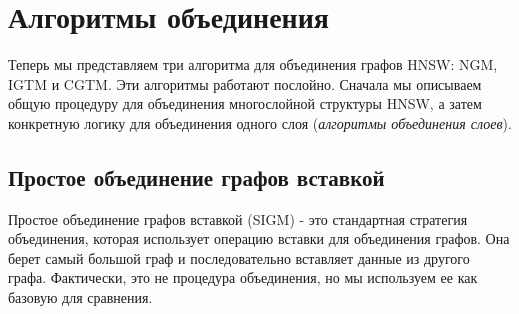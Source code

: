 \documentclass{article}
\begin{document}



\section{Алгоритмы объединения}
Теперь мы представляем три алгоритма для объединения графов HNSW: \textsc{NGM}, \textsc{IGTM} и \textsc{CGTM}. Эти алгоритмы работают послойно. Сначала мы описываем общую процедуру для объединения многослойной структуры HNSW, а затем конкретную логику для объединения одного слоя (\textit{алгоритмы объединения слоев}).
\subsection{Простое объединение графов вставкой}
Простое объединение графов вставкой (SIGM) - это стандартная стратегия объединения, которая использует операцию вставки для объединения графов. Она берет самый большой граф и последовательно вставляет данные из другого графа. Фактически, это не процедура объединения, но мы используем ее как базовую для сравнения.
\end{document}
